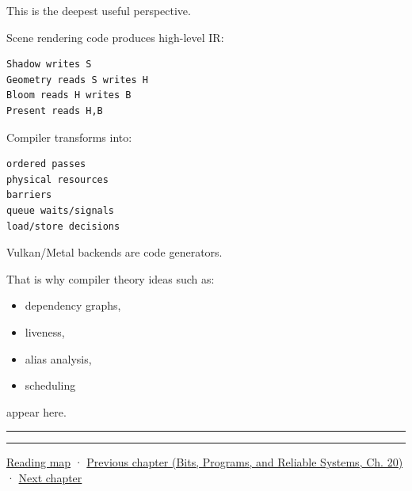 This is the deepest useful perspective.

Scene rendering code produces high-level IR:

\begin{verbatim}
Shadow writes S
Geometry reads S writes H
Bloom reads H writes B
Present reads H,B
\end{verbatim}

Compiler transforms into:

\begin{verbatim}
ordered passes
physical resources
barriers
queue waits/signals
load/store decisions
\end{verbatim}

Vulkan/Metal backends are code generators.

That is why compiler theory ideas such as:

\begin{itemize}
\tightlist
\item
  dependency graphs,
\item
  liveness,
\item
  alias analysis,
\item
  scheduling
\end{itemize}

appear here.

\begin{center}\rule{0.5\linewidth}{0.5pt}\end{center}

\begin{center}\rule{0.5\linewidth}{0.5pt}\end{center}

\hyperref[volume-reading-map]{Reading map} · \href{../01-Bits-Programs-and-Reliable-Systems/main.pdf\#nameddest=06-engine-ii-ch042-from-cartridge-bytes-to-a-reproducible-machine}{Previous chapter (Bits, Programs, and Reliable Systems, Ch. 20)} · \hyperref[06-engine-ii-ch044-cross-backend-conversion-and-agreement]{Next chapter}
